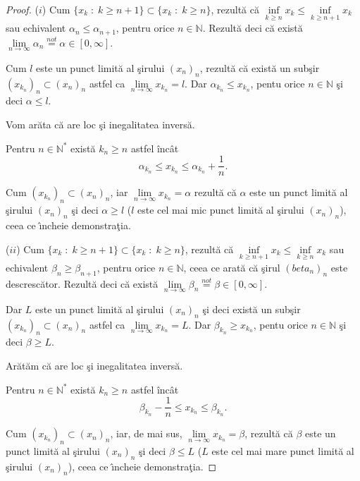 \documentclass[ a4paper, 12pt]{report}
\theoremstyle{definition}
\theoremstyle{remark}
\numberwithin{equation}{section}
\begin{document}
\begin{proof} ($i$) Cum $\{ x_k \; : \; k \geq n + 1\} \subset \{ x_k \; : \; k \geq n \}$, rezult\u a c\u a $\inf\limits_{k \geq n} x_k \leq \inf\limits_{k \geq n + 1} x_k$ sau echivalent $\alpha_n \leq \alpha_{n + 1}$, pentru orice $n \in \mathbb{N}$.
Rezult\u a deci c\u a exist\u a $\lim\limits_{n \rightarrow \infty} \alpha_n \stackrel{not}{=} \alpha \in [0,\infty]$.

Cum $l$ este un punct limit\u a al \c sirului $(x_n)_n$, rezult\u a c\u a exist\u a un sub\c sir $(x_{k_n})_n \subset (x_n)_n$ astfel ca $\lim\limits_{n \to \infty} x_{k_n} = l$.
Dar $\alpha_{k_n} \leq x_{k_n}$, pentu orice $n \in \mathbb{N}$ \c si deci $\alpha \leq l$.

Vom ar\u ata c\u a are loc \c si inegalitatea invers\u a.

Pentru $n \in \mathbb{N}^\ast$ exist\u a $k_n \geq n $ astfel \^inc\^at
$$\alpha_{k_n} \leq x_{k_n} \leq \alpha_{k_n} + \frac{1}{n}.$$

Cum $(x_{k_n})_n \subset (x_n)_n$, iar $\lim\limits_{n \to \infty} x_{k_n} = \alpha$ rezult\u a c\u a $\alpha$ este un punct limit\u a al \c sirului $(x_n)_n$ \c si deci $\alpha \geq l$ ($l$ este cel mai mic punct limit\u a al \c sirului $(x_n)_n$), ceea ce \^\i ncheie demonstra\c tia.

\smallskip

($ii$) Cum $\{ x_k \; : \; k \geq n + 1\} \subset \{ x_k \; : \; k \geq n \}$, rezult\u a c\u a $\inf\limits_{k \geq n + 1} x_k \leq \inf\limits_{k \geq n} x_k$ sau echivalent $\beta_n \geq \beta_{n + 1}$, pentru orice $n \in \mathbb{N}$, ceea ce arat\u a c\u a \c sirul $(beta_n)_n$ este descresc\u ator.
Rezult\u a deci c\u a exist\u a $\lim\limits_{n \rightarrow \infty} \beta_n \stackrel{not}{=} \beta \in [0,\infty]$.

Dar $L$ este un punct limit\u a al \c sirului $(x_n)_n$ \c si deci exist\u a un sub\c sir $(x_{k_n})_n \subset (x_n)_n$ astfel ca $\lim\limits_{n \to \infty} x_{k_n} = L$.
Dar $\beta_{k_n} \geq x_{k_n}$, pentu orice $n \in \mathbb{N}$ \c si deci $\beta \geq L$.

Ar\u at\u am c\u a are loc \c si inegalitatea invers\u a.

Pentru $n \in \mathbb{N}^\ast$ exist\u a $k_n \geq n $ astfel \^inc\^at
$$\beta_{k_n} - \frac{1}{n} \leq x_{k_n} \leq \beta_{k_n}.$$

Cum $(x_{k_n})_n \subset (x_n)_n$, iar, de mai sus, $\lim\limits_{n \to \infty} x_{k_n} = \beta$, rezult\u a c\u a $\beta$ este un punct limit\u a al \c sirului $(x_n)_n$ \c si deci $\beta \leq L$ ($L$ este cel mai mare punct limit\u a al \c sirului $(x_n)_n$), ceea ce \^\i ncheie demonstra\c tia.
\end{proof}
\end{document}
